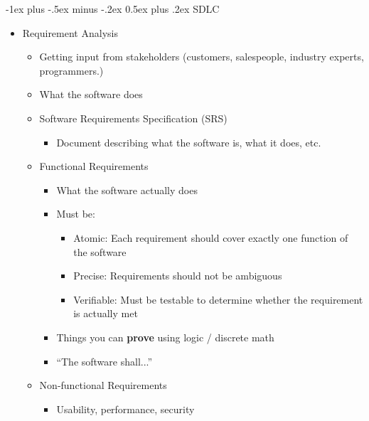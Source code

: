 \documentclass[letterpaper, 8pt]{extarticle}
\makeatletter
\renewcommand{\section}{\@startsection{section}{1}{0mm}%
                                {-1ex plus -.5ex minus -.2ex}%
                                {0.5ex plus .2ex}%
                                {\normalfont\normalsize\bfseries}}
\makeatother
\begin{document}
\begin{multicols*}{6}
    \section{SDLC}
    \begin{itemize}
        \item Requirement Analysis
              \begin{itemize}
                  \item Getting input from stakeholders (customers, salespeople, industry experts, programmers.)
                  \item What the software does
                  \item Software Requirements Specification (SRS)
                        \begin{itemize}
                            \item Document describing what the software is, what it does, etc.
                        \end{itemize}
                  \item Functional Requirements
                        \begin{itemize}
                            \item What the software actually does
                            \item Must be:
                                  \begin{itemize}
                                      \item Atomic: Each requirement should cover exactly one function of the software
                                      \item Precise: Requirements should not be ambiguous
                                      \item Verifiable: Must be testable to determine whether the requirement is actually met
                                  \end{itemize}
                            \item Things you can \textbf{prove} using logic / discrete math
                            \item ``The software shall...''
                        \end{itemize}
                  \item Non-functional Requirements
                        \begin{itemize}
                            \item Usability, performance, security

\end{itemize}
\end{itemize}
\end{itemize}
\end{multicols*}
\end{document}
